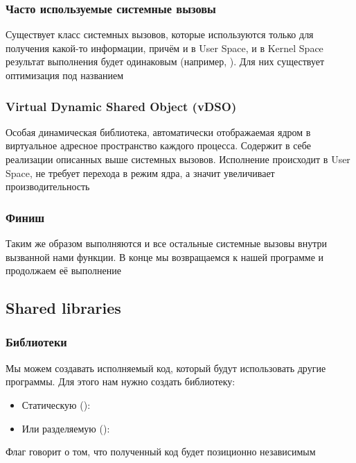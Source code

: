     \subsubsection{Часто используемые системные вызовы}
      Существует класс системных вызовов, которые используются только для получения какой-то информации, причём и в User Space, и в Kernel Space результат выполнения будет одинаковым (например, ). Для них существует оптимизация под названием 
    
    \subsubsection{Virtual Dynamic Shared Object (vDSO)}
      Особая динамическая библиотека, автоматически отображаемая ядром в виртуальное адресное пространство каждого процесса. Содержит в себе реализации описанных выше системных вызовов. Исполнение происходит в User Space, не требует перехода в режим ядра, а значит увеличивает производительность
    
    \subsubsection{Финиш}
      Таким же образом выполняются и все остальные системные вызовы внутри вызванной нами функции. В конце мы возвращаемся к нашей программе и продолжаем её выполнение
  
  \subsection{Shared libraries}
    \subsubsection{Библиотеки}
      Мы можем создавать исполняемый код, который будут использовать другие программы. Для этого нам нужно создать библиотеку:
      \begin{itemize}
        \item Статическую (): 
        \item Или разделяемую (): 
      \end{itemize}
      Флаг  говорит о том, что полученный код будет позиционно независимым
    
